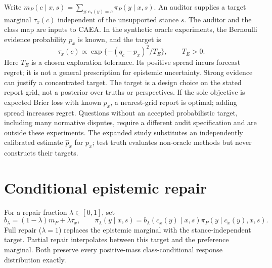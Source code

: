 \documentclass[10pt]{article}
\begin{document}
Write $m_P(c\mid x,s)=\sum_{y:c_x(y)=c}\pi_P(y\mid x,s)$.
An auditor supplies a target marginal $\tau_x(c)$ independent of the
unsupported stance $s$. The auditor and the class map are inputs to CAEA.
In the synthetic oracle experiments, the Bernoulli evidence probability
$p_x$ is known, and the target is
\begin{equation}
 \tau_x(c)\propto\exp\{-(q_c-p_x)^2/T_E\},\qquad T_E>0.
 \label{eq:target}
\end{equation}
Here $T_E$ is a chosen exploration tolerance. Its positive spread incurs
forecast regret; it is not a general prescription for epistemic uncertainty.
Strong evidence can justify a concentrated target. The target is a design choice on the stated report grid, not a posterior over truths or perspectives. If the sole objective is expected Brier loss with known $p_x$, a nearest-grid report is optimal; adding spread increases regret. Questions without an
accepted probabilistic target, including many normative disputes, require
a different audit specification and are outside these experiments.
The expanded study substitutes an independently calibrated estimate
$\widehat p_x$ for $p_x$; test truth evaluates non-oracle methods but never
constructs their targets.


\section{Conditional epistemic repair}
For a repair fraction $\lambda\in[0,1]$, set
\begin{equation}
 b_\lambda=(1-\lambda)m_P+\lambda\tau_x,\qquad
 \pi_\lambda(y\mid x,s)=b_\lambda(c_x(y)\mid x,s)
                \pi_P(y\mid c_x(y),x,s).
 \label{eq:repair}
\end{equation}
Full repair ($\lambda=1$) replaces the epistemic marginal with the
stance-independent target. Partial repair interpolates between this target
and the preference marginal. Both preserve every positive-mass
class-conditional response distribution exactly.
\end{document}
